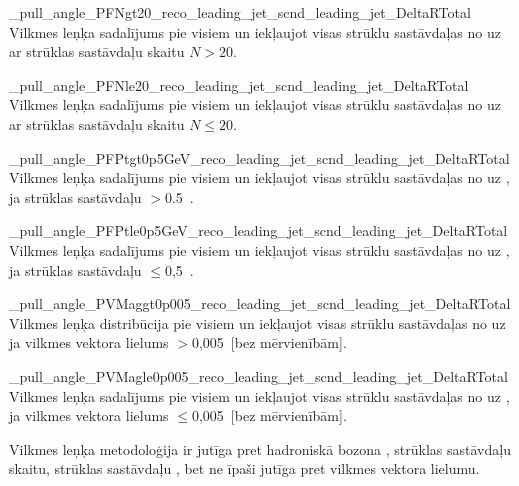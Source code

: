           {_pull_angle_PFNgt20_reco_leading_jet_scnd_leading_jet_DeltaRTotal}
          {Vilkmes leņķa sadalījums pie visiem \DeltaR un iekļaujot visas strūklu sastāvdaļas no \leadingjet uz \scndleadingjet ar strūklas sastāvdaļu skaitu $N>20$.}

          {_pull_angle_PFNle20_reco_leading_jet_scnd_leading_jet_DeltaRTotal}
          {Vilkmes leņķa sadalījums pie visiem \DeltaR un iekļaujot visas strūklu sastāvdaļas no \leadingjet uz \scndleadingjet ar strūklas sastāvdaļu skaitu $N\leq20$.}

          {_pull_angle_PFPtgt0p5GeV_reco_leading_jet_scnd_leading_jet_DeltaRTotal}
          {Vilkmes leņķa sadalījums pie visiem \DeltaR un iekļaujot visas strūklu sastāvdaļas no \leadingjet uz \scndleadingjet, ja strūklas sastāvdaļu \pt$>$0.5~\GeV.}

          {_pull_angle_PFPtle0p5GeV_reco_leading_jet_scnd_leading_jet_DeltaRTotal}
          {Vilkmes leņķa sadalījums pie visiem \DeltaR un iekļaujot visas strūklu sastāvdaļas no \leadingjet uz \scndleadingjet, ja strūklas sastāvdaļu \pt$\leq$0,5~\GeV.}

          {_pull_angle_PVMaggt0p005_reco_leading_jet_scnd_leading_jet_DeltaRTotal}
          {Vilkmes leņķa distribūcija pie visiem \DeltaR un iekļaujot visas strūklu sastāvdaļas no \leadingjet uz \scndleadingjet ja vilkmes vektora lielums $>$0,005~[bez mērvienībām].}

          {_pull_angle_PVMagle0p005_reco_leading_jet_scnd_leading_jet_DeltaRTotal}
          {Vilkmes leņķa sadalījums pie visiem \DeltaR un iekļaujot visas strūklu sastāvdaļas no \leadingjet uz \scndleadingjet, ja vilkmes vektora lielums $\leq$0,005~[bez mērvienībām].}

Vilkmes leņķa metodoloģija ir jutīga pret hadroniskā \PW bozona \pt, strūklas sastāvdaļu skaitu, strūklas sastāvdaļu \pt, bet ne īpaši jutīga pret vilkmes vektora lielumu. 

